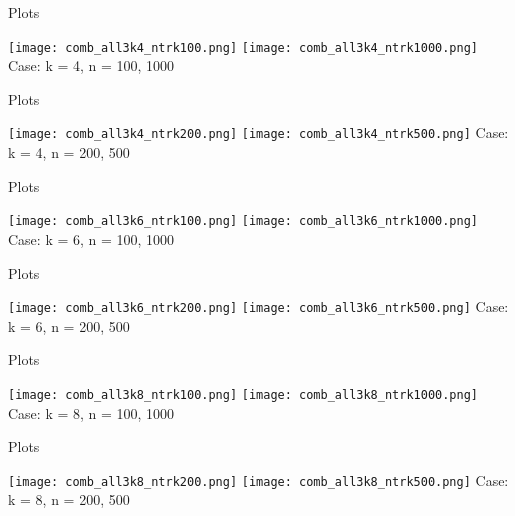 \documentclass[aspectratio=169,compress,10pt]{beamer} %
\begin{document}
\begin{frame}{Plots}
\begin{adjustwidth}{-2em}{-2em}
\texttt{[image: comb\_all3k4\_ntrk100.png]}
\texttt{[image: comb\_all3k4\_ntrk1000.png]}
Case: k = 4, n = 100, 1000
\end{adjustwidth}
\end{frame}

\begin{frame}{Plots}
\begin{adjustwidth}{-2em}{-2em}
\texttt{[image: comb\_all3k4\_ntrk200.png]}
\texttt{[image: comb\_all3k4\_ntrk500.png]}
Case: k = 4, n = 200, 500
\end{adjustwidth}
\end{frame}

\begin{frame}{Plots}
\begin{adjustwidth}{-2em}{-2em}
\texttt{[image: comb\_all3k6\_ntrk100.png]}
\texttt{[image: comb\_all3k6\_ntrk1000.png]}
Case: k = 6, n = 100, 1000
\end{adjustwidth}
\end{frame}

\begin{frame}{Plots}
\begin{adjustwidth}{-2em}{-2em}
\texttt{[image: comb\_all3k6\_ntrk200.png]}
\texttt{[image: comb\_all3k6\_ntrk500.png]}
Case: k = 6, n = 200, 500
\end{adjustwidth}
\end{frame}

\begin{frame}{Plots}
\begin{adjustwidth}{-2em}{-2em}
\texttt{[image: comb\_all3k8\_ntrk100.png]}
\texttt{[image: comb\_all3k8\_ntrk1000.png]}
Case: k = 8, n = 100, 1000
\end{adjustwidth}
\end{frame}

\begin{frame}{Plots}
\begin{adjustwidth}{-2em}{-2em}
\texttt{[image: comb\_all3k8\_ntrk200.png]}
\texttt{[image: comb\_all3k8\_ntrk500.png]}
Case: k = 8, n = 200, 500
\end{adjustwidth}
\end{frame}
\end{document}
